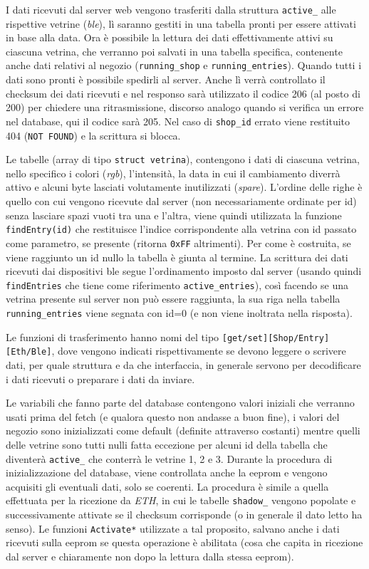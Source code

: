 I dati ricevuti dal server web vengono trasferiti dalla struttura \texttt{active\_} alle rispettive vetrine (\textit{ble}), l\`i saranno gestiti in una tabella pronti per essere attivati in base alla data. Ora \`e possibile la lettura dei dati effettivamente attivi su ciascuna vetrina, che verranno poi salvati in una tabella specifica, contenente anche dati relativi al negozio (\texttt{running\_shop} e \texttt{running\_entries}). Quando tutti i dati sono pronti \`e possibile spedirli al server. Anche l\`i verr\`a controllato il checksum dei dati ricevuti e nel responso sar\`a utilizzato il codice 206 (al posto di 200) per chiedere una ritrasmissione, discorso analogo quando si verifica un errore nel database, qui il codice sar\`a 205. Nel caso di \texttt{shop\_id} errato viene restituito 404 (\texttt{NOT FOUND}) e la scrittura si blocca.

Le tabelle (array di tipo \texttt{struct vetrina}), contengono i dati di ciascuna vetrina, nello specifico i colori (\textit{rgb}), l'intensit\`a, la data in cui il cambiamento diverr\`a attivo e alcuni byte lasciati volutamente inutilizzati (\textit{spare}). L'ordine delle righe \`e quello con cui vengono ricevute dal server (non necessariamente ordinate per id) senza lasciare spazi vuoti tra una e l'altra, viene quindi utilizzata la funzione \texttt{findEntry(id)} che restituisce l'indice corrispondente alla vetrina con id passato come parametro, se presente (ritorna \texttt{0xFF} altrimenti). Per come \`e costruita, se viene raggiunto un id nullo la tabella \`e giunta al termine. La scrittura dei dati ricevuti dai dispositivi ble segue l'ordinamento imposto dal server (usando quindi \texttt{findEntries} che tiene come riferimento \texttt{active\_entries}), cos\`i facendo se una vetrina presente sul server non pu\`o essere raggiunta, la sua riga nella tabella \texttt{running\_entries} viene segnata con id=0 (e non viene inoltrata nella risposta).

Le funzioni di trasferimento hanno nomi del tipo \texttt{[get/set][Shop/Entry][Eth/Ble]}, dove vengono indicati rispettivamente se devono leggere o scrivere dati, per quale struttura e da che interfaccia, in generale servono per decodificare i dati ricevuti o preparare i dati da inviare.

Le variabili che fanno parte del database contengono valori iniziali che verranno usati prima del fetch (e qualora questo non andasse a buon fine), i valori del negozio sono inizializzati come default (definite attraverso costanti) mentre quelli delle vetrine sono tutti nulli fatta eccezione per alcuni id della tabella che diventer\`a \texttt{active\_} che conterr\`a le vetrine 1, 2 e 3. Durante la procedura di inizializzazione del database, viene controllata anche la eeprom e vengono acquisiti gli eventuali dati, solo se coerenti. La procedura \`e simile a quella effettuata per la ricezione da \textit{ETH}, in cui le tabelle \texttt{shadow\_} vengono popolate e successivamente attivate se il checksum corrisponde (o in generale il dato letto ha senso). Le funzioni \texttt{Activate*} utilizzate a tal proposito, salvano anche i dati ricevuti sulla eeprom se questa operazione \`e abilitata (cosa che capita in ricezione dal server e chiaramente non dopo la lettura dalla stessa eeprom).

